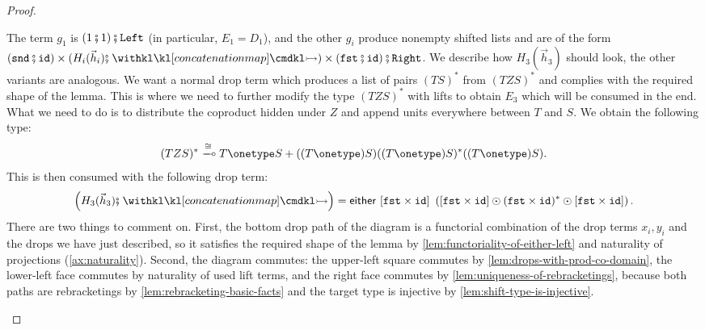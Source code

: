 \begin{proof}
\begin{description}
\begin{description}
            The term $g_1$ is $(1 \comp 1) \comp \leftterm$ (in particular, $E_1 = D_1$), and the other $g_i$ produce nonempty shifted lists and are of the form $(\sndterm \comp \idterm) \times (H_i(\vec h_i) \comp \concmap) \times (\fstterm \comp \idterm) \comp \rightterm$. We describe how $H_3(\vec h_3)$ should look, the other variants are analogous. We want a normal drop term which produces a list of pairs $(TS)^*$ from $(TZS)^*$ and complies with the required shape of the lemma. This is where we need to further modify the type $(TZS)^*$ with lifts to obtain $E_3$ which will be consumed in the end. What we need to do is to distribute the coproduct hidden under $Z$ and append units everywhere between $T$ and $S$. We obtain the following type: 
            \[
                (TZS)^* \xmultimap{\cong} T \onetype S + ((T \onetype) S) ((T \onetype) S)^* ((T \onetype) S).
            \] 
            This is then consumed with the following drop term: 
            \[
                \left( H_3(\vec h_3) \comp \concmap \right) = \either{[\fstterm \times \idterm]}{\left( [\fstterm \times \idterm] \odot (\fstterm \times \idterm)^* \odot [\fstterm \times \idterm] \right)}.
            \]
            There are two things to comment on. First, the bottom drop path of the diagram is a functorial combination of the drop terms $x_i, y_i$ and the drops we have just described, so it satisfies the required shape of the lemma by \cref{lem:functoriality-of-either-left} and naturality of projections (\cref{ax:naturality}). Second, the diagram commutes: the upper-left square commutes by \cref{lem:drops-with-prod-co-domain}, the lower-left face commutes by naturality of used lift terms, and the right face commutes by \cref{lem:uniqueness-of-rebracketings}, because both paths are rebracketings by \cref{lem:rebracketing-basic-facts} and the target type is injective by \cref{lem:shift-type-is-injective}. 
        \end{description}


\end{description}
\end{proof}
